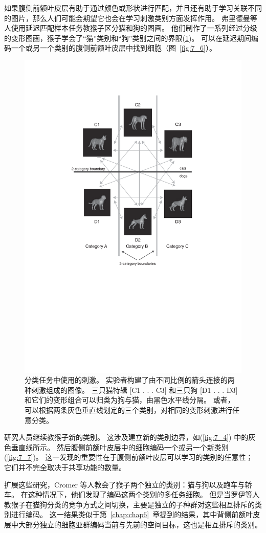 如果腹侧前额叶皮层有助于通过颜色或形状进行匹配，并且还有助于学习关联不同的图片，那么人们可能会期望它也会在学习刺激类别方面发挥作用。 
弗里德曼等人\cite{freedman2001categorical,freedman2002visual}使用延迟匹配样本任务教猴子区分猫和狗的图画。 
他们制作了一系列经过分级的变形图画，猴子学会了“猫”类别和“狗”类别之间的界限(\ref{fig:7_5})。 
可以在延迟期间编码一个或另一个类别的腹侧前额叶皮层中找到细胞（图~\ref{fig:7_6}）。


\begin{figure}
	\centering
	\includegraphics[width=0.6\linewidth]{chap7/7_5}
	\caption{分类任务中使用的刺激。 
		实验者构建了由不同比例的箭头连接的两种刺激组成的图像。 
		三只猫特辑 [C1 . . . C3] 和三只狗 [D1 . . . D3] 和它们的变形组合可以归类为狗与猫，由黑色水平线分隔。 
		或者，可以根据两条灰色垂直线划定的三个类别，对相同的变形刺激进行任意分类\cite{freedman2002visual}。 \label{fig:7_5}}
\end{figure}
\par


研究人员继续教猴子新的类别。 
这涉及建立新的类别边界，如(\ref{fig:7_4}) 中的灰色垂直线所示。 
然后腹侧前额叶皮层中的细胞编码一个或另一个新类别(\ref{fig:7_7})。 
这一发现的重要性在于腹侧前额叶皮层可以学习的类别的任意性；
它们并不完全取决于共享功能的数量。
\par


扩展这些研究，Cromer 等人\cite{cromer2010representation}教会了猴子两个独立的类别：猫与狗以及跑车与轿车。
在这种情况下，他们发现了编码这两个类别的多任务细胞。 
但是当罗伊等人\cite{roy2010prefrontal}教猴子在猫狗分类的竞争方式之间切换，主要是独立的子种群对这些相互排斥的类别进行编码。 
这一结果类似于第~\ref{chap:chap6}~章提到的结果，其中背侧前额叶皮层中大部分独立的细胞亚群编码当前与先前的空间目标，这也是相互排斥的类别\cite{genovesio2006representation}。
\par


